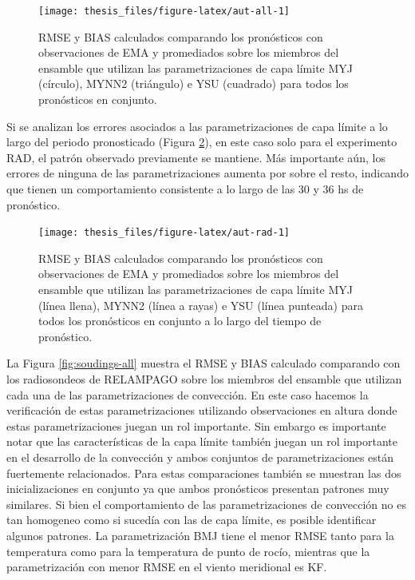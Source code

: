 \documentclass[12pt,oneside,a4paper]{reedthesis}
\begin{document}
\begin{figure}

{\centering \texttt{[image: thesis\_files/figure-latex/aut-all-1]} 

}

\caption{RMSE y BIAS calculados comparando los pronósticos con observaciones de EMA y promediados sobre los miembros del ensamble que utilizan las parametrizaciones de capa límite MYJ (círculo), MYNN2 (triángulo) e YSU (cuadrado) para todos los pronósticos en conjunto.}\label{fig:aut-all}
\end{figure}
Si se analizan los errores asociados a las parametrizaciones de capa límite a lo largo del periodo pronosticado (Figura \ref{fig:aut-rad}), en este caso solo para el experimento RAD, el patrón observado previamente se mantiene. Más importante aún, los errores de ninguna de las parametrizaciones aumenta por sobre el resto, indicando que tienen un comportamiento consistente a lo largo de las 30 y 36 hs de pronóstico.


\begin{figure}

{\centering \texttt{[image: thesis\_files/figure-latex/aut-rad-1]} 

}

\caption{RMSE y BIAS calculados comparando los pronósticos con observaciones de EMA y promediados sobre los miembros del ensamble que utilizan las parametrizaciones de capa límite MYJ (línea llena), MYNN2 (línea a rayas) e YSU (línea punteada) para todos los pronósticos en conjunto a lo largo del tiempo de pronóstico.}\label{fig:aut-rad}
\end{figure}
La Figura \ref{fig:soudings-all} muestra el RMSE y BIAS calculado comparando con los radiosondeos de RELAMPAGO sobre los miembros del ensamble que utilizan cada una de las parametrizaciones de convección. En este caso hacemos la verificación de estas parametrizaciones utilizando observaciones en altura donde estas parametrizaciones juegan un rol importante. Sin embargo es importante notar que las características de la capa límite también juegan un rol importante en el desarrollo de la convección y ambos conjuntos de parametrizaciones están fuertemente relacionados. Para estas comparaciones también se muestran las dos inicializaciones en conjunto ya que ambos pronósticos presentan patrones muy similares. Si bien el comportamiento de las parametrizaciones de convección no es tan homogeneo como si sucedía con las de capa límite, es posible identificar algunos patrones. La parametrización BMJ tiene el menor RMSE tanto para la temperatura como para la temperatura de punto de rocío, mientras que la parametrización con menor RMSE en el viento meridional es KF.
\end{document}
